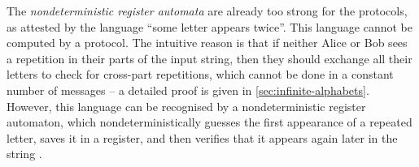     

\begin{myexample}
    \label{ex:reg-ndet-too-strong}
    The \emph{nondeterministic register automata} \cite[Definition~1]{kaminskiFiniteMemoryAutomata1994} are already too strong for the protocols, as attested by the language
    ``some letter appears twice''. This language cannot be computed by a protocol. The intuitive reason is that if neither Alice or Bob sees a repetition in their parts of the input string, then they should exchange all their letters to check for cross-part repetitions, which cannot be done in a constant number of messages -- 
    a detailed proof is given in \cref{sec:infinite-alphabets}. However, this language can be recognised by a nondeterministic register automaton, 
    which nondeterministically guesses the first appearance of a repeated letter, saves it in a register, and then verifies that it appears again later in the string
    \cite[Example~1]{kaminskiFiniteMemoryAutomata1994}.
\end{myexample}

